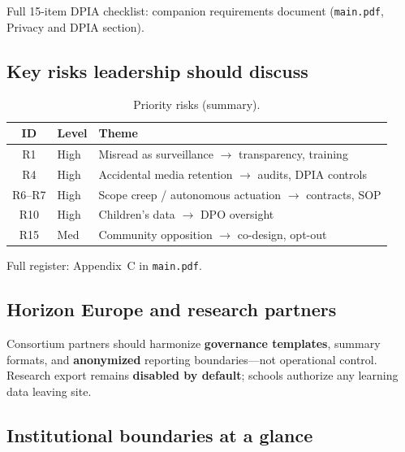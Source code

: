 Full 15-item DPIA checklist: companion requirements document (\texttt{main.pdf}, Privacy and DPIA section).

\subsection{Key risks leadership should discuss}

\begin{table}[htbp]
  \centering
  \caption{Priority risks (summary).}
  \label{tab:exec-risks}
  \small
  \begin{tabular}{@{}clp{6.5cm}@{}}
    \toprule
    ID & Level & Theme \\
    \midrule
    R1 & High & Misread as surveillance $\rightarrow$ transparency, training \\
    R4 & High & Accidental media retention $\rightarrow$ audits, DPIA controls \\
    R6--R7 & High & Scope creep / autonomous actuation $\rightarrow$ contracts, SOP \\
    R10 & High & Children's data $\rightarrow$ DPO oversight \\
    R15 & Med & Community opposition $\rightarrow$ co-design, opt-out \\
    \bottomrule
  \end{tabular}
\end{table}

Full register: Appendix~C in \texttt{main.pdf}.



\subsection{Horizon Europe and research partners}

Consortium partners should harmonize \textbf{governance templates}, summary formats, and
\textbf{anonymized} reporting boundaries---not operational control.
Research export remains \textbf{disabled by default}; schools authorize any learning data leaving site.

\subsection{Institutional boundaries at a glance}

\begin{center}
\end{center}

